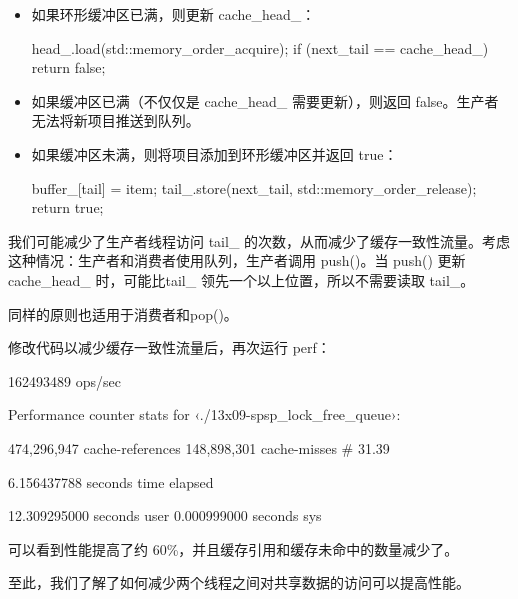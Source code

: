 \begin{itemize}
\item
如果环形缓冲区已满，则更新 cache\_head\_：

\begin{cpp}
head_.load(std::memory_order_acquire);
        if (next_tail == cache_head_) {
            return false;
        }
\end{cpp}

\item
如果缓冲区已满（不仅仅是 cache\_head\_ 需要更新），则返回 false。生产者无法将新项目推送到队列。

\item
如果缓冲区未满，则将项目添加到环形缓冲区并返回 true：

\begin{cpp}
buffer_[tail] = item;
    tail_.store(next_tail, std::memory_order_release);
    return true;
\end{cpp}
\end{itemize}

我们可能减少了生产者线程访问 tail\_ 的次数，从而减少了缓存一致性流量。考虑这种情况：生产者和消费者使用队列，生产者调用 push()。当 push() 更新 cache\_head\_ 时，可能比tail\_ 领先一个以上位置，所以不需要读取 tail\_。

同样的原则也适用于消费者和pop()。

修改代码以减少缓存一致性流量后，再次运行 perf：

\begin{shell}
162493489 ops/sec

  Performance counter stats for ‹./13x09-spsp_lock_free_queue›:

        474,296,947     cache-references
        148,898,301     cache-misses           # 31.39%

        6.156437788 seconds time elapsed

       12.309295000 seconds user
        0.000999000 seconds sys
\end{shell}

可以看到性能提高了约 60\%，并且缓存引用和缓存未命中的数量减少了。

至此，我们了解了如何减少两个线程之间对共享数据的访问可以提高性能。




























